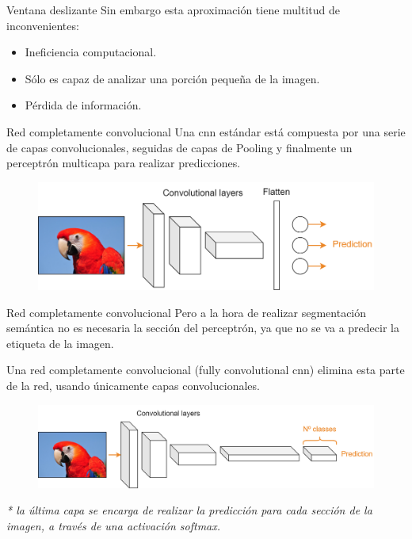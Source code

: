 \begin{frame}{Ventana deslizante}
Sin embargo esta aproximación tiene multitud de inconvenientes:
\begin{itemize}
    \item \alert{Ineficiencia computacional}.
    \item \alert{Sólo es capaz de analizar una porción pequeña de la imagen}.
    \item \alert{Pérdida de información}.
\end{itemize}
\end{frame}

\begin{frame}{Red completamente convolucional}
Una \alert{\gls{cnn} estándar} está compuesta por una serie de capas convolucionales, seguidas de capas de Pooling y finalmente un \alert{perceptrón multicapa} para realizar predicciones.

\begin{figure}
    \centering
    \includegraphics[width=\textwidth]{figures/Tema 4/StandardCNN.png}
\end{figure}
\end{frame}

\begin{frame}{Red completamente convolucional}
Pero a la hora de realizar \alert{segmentación semántica} no es necesaria la sección del \alert{perceptrón}, ya que no se va a predecir la etiqueta de la imagen.

Una red \alert{completamente convolucional} (fully convolutional \gls{cnn})\cite{long2015fully} elimina esta parte de la red, usando únicamente capas convolucionales.

\begin{figure}
    \centering
    \includegraphics[width=\textwidth]{figures/Tema 4/FullyCNN.png}
\end{figure}

\textit{* la última capa se encarga de realizar la predicción para cada sección de la imagen, a través de una activación softmax.}
\end{frame}

